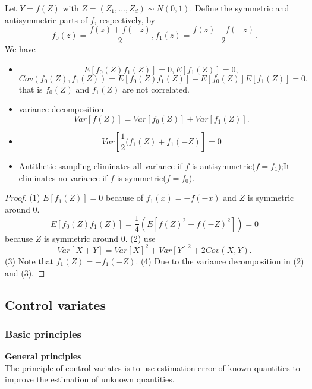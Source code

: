 \begin{refsection}
\begin{lemma}\cite[208]{glasserman2003monte}
	Let $Y = f(Z)$  with $Z=(Z_1,...,Z_d) \sim N(0,1)$. Define the symmetric and antisymmetric parts of $f$, respectively, by
	$$f_0(z) = \frac{f(z) + f(-z)}{2}, f_1(z) = \frac{f(z) - f(-z)}{2}.$$
	We have
	\begin{itemize}
		\item $$E[f_0(Z)f_1(Z)] = 0, E[f_1(Z)] = 0,$$  $$Cov(f_0(Z),f_1(Z)) = E[f_0(Z)f_1(Z)] - E[f_0(Z)]E[f_1(Z)] = 0. $$
		that is $f_0(Z)$ and $f_1(Z)$ are not correlated.
		\item variance decomposition $$Var[f(Z)] = Var[f_0(Z)] + Var[f_1(Z)].$$
		\item $$Var[\frac{1}{2}(f_1(Z) + f_1(-Z)] = 0$$
		\item Antithetic sampling eliminates all variance if $f$ is antisymmetric($f=f_1$);It eliminates no variance if $f$ is symmetric($f=f_0$).
	\end{itemize}
\end{lemma}
\begin{proof}
	(1) $E[f_1(Z)] = 0$ because of $f_1(x) = -f(-x)$ and $Z$ is symmetric around $0$.
	$$E[f_0(Z)f_1(Z)] = \frac{1}{4}(E[f(Z)^2 + f(-Z)^2]) = 0$$
	because $Z$ is symmetric around $0$. 
	(2) use$$Var[X+Y]=Var[X]^2+Var[Y]^2 + 2Cov(X,Y).$$
	(3) Note that $f_1(Z) = - f_1(-Z)$. (4) Due to the variance decomposition in (2) and (3).
\end{proof}



\subsection{Control variates}
\subsubsection{Basic principles}
\begin{mdframed}
	\textbf{General principles}\\
	The principle of control variates is to use estimation error of known quantities to improve the estimation of unknown quantities.\\
\end{mdframed}


\end{refsection}
